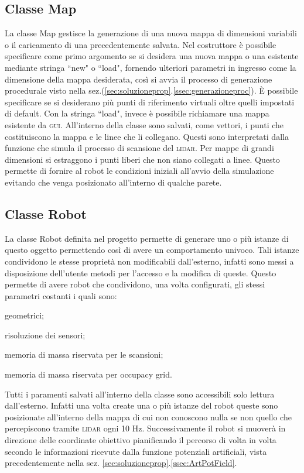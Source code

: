\subsection{Classe Map}
\label{ssec:ClassMap}
La classe Map gestisce la generazione di una nuova mappa di dimensioni variabili
o il caricamento di una precedentemente salvata.
Nel costruttore è possibile
specificare come primo argomento se si desidera una nuova mappa o una esistente
mediante stringa ``new" o ``load", fornendo ulteriori parametri in ingresso come
la dimensione della mappa desiderata, così si avvia il processo di generazione
procedurale visto nella sez.(\ref{sec:soluzioneprop}.\ref{ssec:generazioneproc}).
È possibile specificare se si desiderano più punti di riferimento virtuali oltre
quelli impostati di default.
Con la stringa ``load", invece è possibile richiamare una mappa esistente da
\textsc{gui}.
All'interno della classe sono salvati, come vettori, i punti che costituiscono
la mappa e le linee che li collegano. Questi sono interpretati dalla funzione
che simula il processo di scansione del \textsc{lidar}.
Per mappe di grandi dimensioni si estraggono i punti liberi che non siano
collegati a linee. Questo permette di fornire al robot le condizioni iniziali
all'avvio della simulazione evitando che venga posizionato all'interno di
qualche parete.

\subsection{Classe Robot}
\label{ssec:ClassRobot}
La classe Robot definita nel progetto permette di generare uno o più istanze di
questo oggetto permettendo così di avere un comportamento univoco.
Tali istanze condividono le stesse proprietà non modificabili dall'esterno,
infatti sono messi a disposizione dell'utente metodi per l'accesso e la
modifica di queste.
Questo permette di avere robot che condividono, una volta configurati, gli
stessi parametri costanti i quali sono:
\begin{enumerate*}[label={\alph*)},font={\bfseries}]
	\item geometrici;
	\item risoluzione dei sensori;
	\item memoria di massa riservata per le scansioni;
	\item memoria di massa riservata per occupacy grid.
\end{enumerate*}
Tutti i paramenti salvati all'interno della classe sono accessibili solo
lettura dall'esterno.
Infatti una volta create una o più istanze del robot queste sono posizionate
all'interno della mappa di cui non conoscono nulla se non quello che
percepiscono tramite \textsc{lidar} ogni 10 \si{\hertz}.
Successivamente il robot si muoverà in direzione delle coordinate obiettivo
pianificando il percorso di volta in volta secondo le informazioni ricevute
dalla funzione potenziali artificiali, vista precedentemente nella
sez. \ref{sec:soluzioneprop}.\ref{ssec:ArtPotField}.

